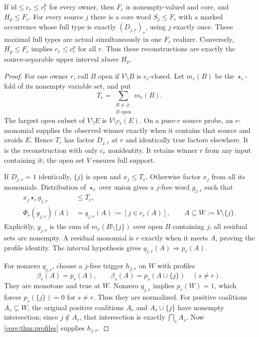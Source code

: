 \begin{theorem}
\label{core:thm:capture-trigger-normal-form}
If $\mathrm{id}\leq c_r\leq c_r^p$ for every owner, then $F_c$ is
nonempty-valued and core, and $H_p\leq F_c$. For every source $j$
there is a core word $S_j\leq F_c$ with a marked occurrence whose
full type is exactly $(D_{j,r})_r$, using $j$ exactly once. These maximal
full types are actual simultaneously in one $F_c$ realizer.
Conversely, $H_p\leq F_c$ implies $c_r\leq c_r^p$ for all $r$.
Thus these reconstructions are exactly the source-separable upper
interval above $H_p$.
\end{theorem}
\begin{proof}
For one owner $r$, call $B$ open if $V\setminus B$ is $c_r$-closed.
Let $m_r(B)$ be the $\star_r$-fold of its nonempty variable set, and put
\[
 T_r=\sum_{\substack{B\ne\varnothing\\B\text{ open}}}m_r(B).
\]
The largest open subset of $V\setminus E$ is $V\setminus c_r(E)$.
On a pure-$r$ source probe, an $r$-monomial supplies the observed winner
exactly when it contains that source and avoids $E$. Hence $T_r$ has
factor $D_{j,r}$ at $r$ and identically true factors elsewhere. It is
the reconstruction with only $c_r$ nonidentity. It retains winner $r$
from any input containing it; the open set $V$ ensures full support.

If $D_{j,r}=1$ identically, $\{j\}$ is open and $x_j\leq T_r$.
Otherwise factor $x_j$ from all its monomials. Distribution of
$\star_r$ over union gives a $j$-free word $g_{j,r}$ such that
\begin{equation}\label{core:eq:trigger-source-factor}
 \begin{aligned}
 x_j\star_r g_{j,r}&\leq T_r,\\
 \Phi_r(g_{j,r})(A)&=q_{j,r}(A):=[j\in c_r(A)],
 \qquad A\subseteq W:=V\setminus\{j\}.
 \end{aligned}
\end{equation}
Explicitly, $g_{j,r}$ is the sum of $m_r(B\setminus\{j\})$ over
open $B$ containing $j$; all residual sets are nonempty. A residual
monomial is $r$ exactly when it meets $A$, proving the profile identity.
The interval hypothesis gives $q_{j,r}(A)\Rightarrow p_r(A)$.

For nonzero $q_{j,r}$, choose a $j$-free trigger $h_{j,r}$ on $W$
with profiles
\[
 \beta_r(A)=p_r(A),\qquad
 \beta_s(A)=p_s(A\cup\{j\})\quad(s\ne r).
\]
They are monotone and true at $W$. Nonzero $q_{j,r}$ implies $p_r(W)=1$,
which forces $p_s(\{j\})=0$ for $s\ne r$. Thus they are normalized.
For positive coalitions $A_s\subseteq W$, the original positive
coalitions $A_r$ and $A_s\cup\{j\}$ have nonempty intersection;
since $j\notin A_r$, that intersection is exactly $\bigcap_s A_s$.
Now \cref{core:thm:profiles} supplies $h_{j,r}$.


\end{proof}
